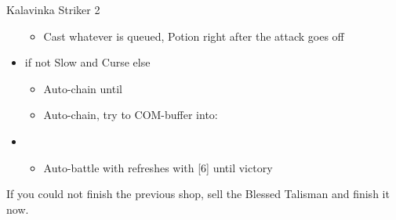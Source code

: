 \begin{paracol}{2}
\begin{battle}{Kalavinka Striker 2}
\begin{itemize}
\begin{itemize}
				      \item Cast whatever is queued, Potion right after the attack goes off
			      \end{itemize}
			\item \second if not Slow and Curse else \fourth
			      \begin{itemize}
				      \item Auto-chain until \stagger
				      \item Auto-chain, try to COM-buffer into:
			      \end{itemize}
			\item \fifth
			      \begin{itemize}
				      \item Auto-battle with refreshes with [6] until victory
			      \end{itemize}
		\end{itemize}
	\end{battle}
	\switchcolumn*
	If you could not finish the previous shop, sell the Blessed Talisman and finish it now.


\end{paracol}
